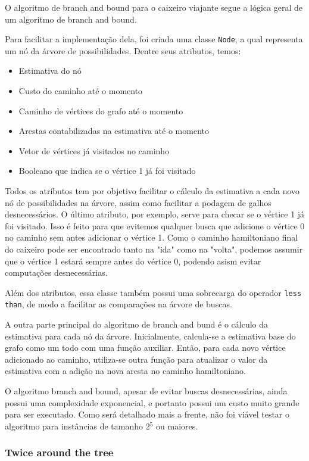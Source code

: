 \documentclass{article}
\begin{document}
O algoritmo de branch and bound para o caixeiro viajante segue a lógica geral de um algoritmo de branch and bound.

Para facilitar a implementação dela, foi criada uma classe \texttt{Node}, a qual representa um nó da árvore de possibilidades. Dentre seus atributos, temos:

\begin{itemize}
\item Estimativa do nó
\item Custo do caminho até o momento
\item Caminho de vértices do grafo até o momento
\item Arestas contabilizadas na estimativa até o momento
\item Vetor de vértices já visitados no caminho
\item Booleano que indica se o vértice 1 já foi visitado
\end{itemize}

Todos os atributos tem por objetivo facilitar o cálculo da estimativa a cada novo nó de possibilidades na árvore, assim como facilitar a podagem de galhos desnecessários. O último atributo, por exemplo, serve para checar se o vértice 1 já foi visitado. Isso é feito para que evitemos qualquer busca que adicione o vértice 0 no caminho sem antes adicionar o vértice 1. Como o caminho hamiltoniano final do caixeiro pode ser encontrado tanto na "ida" como na "volta", podemos assumir que o vértice 1 estará sempre antes do vértice 0, podendo asism evitar computações desnecessárias.

Além dos atributos, essa classe também possui uma sobrecarga do operador \texttt{less than}, de modo a facilitar as comparações na árvore de buscas.

A outra parte principal do algoritmo de branch and bund é o cálculo da estimativa para cada nó da árvore. Inicialmente, calcula-se a estimativa base do grafo como um todo com uma função auxiliar. Então, para cada novo vértice adicionado ao caminho, utiliza-se outra função para atualizar o valor da estimativa com a adição na nova aresta no caminho hamiltoniano.

O algoritmo branch and bound, apesar de evitar buscas desnecessárias, ainda possui uma complexidade exponencial, e portanto possui um custo muito grande para ser executado. Como será detalhado mais a frente, não foi viável testar o algoritmo para instâncias de tamanho 2$^5$ ou maiores.

\subsubsection{Twice around the tree}
\end{document}
